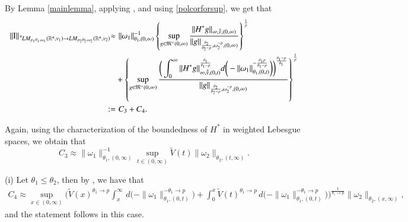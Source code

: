 \documentclass[11pt]{amsart}
\theoremstyle{plain}
\theoremstyle{definition}
\numberwithin{thm}{section}
\numberwithin{equation}{section}
\begin{document}
By  Lemma \ref{mainlemma}, applying \cite[Theorem~4.2, (d)]{mu_emb}, and using \eqref{polcorforsup}, we get that
\begin{align*}
\|{\operatorname{I}}\|_{{\,^{^{\bf c}}\!} LM_{p_1{\theta}_1,{\omega}_1}({{\mathbb R}^n},v_1){\rightarrow} LM_{p_2{\theta}_2,{\omega}_2}({{\mathbb R}^n},v_2)} {\approx} & \,\, \|{\omega}_1\|_{{\theta}_1,(0,\infty)}^{-1} \left\{\sup_{g\in {\mathfrak M}^+(0,\infty)} {\frac{\displaystyle {\|H^*g\|_{\infty,\tilde{\tilde{v}},(0,\infty)}}}{\displaystyle {\|g\|_{\frac{{\theta}_2}{{\theta}_2-p},{\omega}_2^{-p},(0,\infty)}}}} \right\}^{\frac{1}{p}}\\
&  + \left\{\sup_{g\in {\mathfrak M}^+(0,\infty)} {\frac{\displaystyle {\bigg(\int_0^{\infty} \|H^*g\|_{\infty,\tilde{\tilde {v}}, (0,t)} ^{\frac{{\theta}_1}{{\theta}_1 - p}} d\bigg(-\|{\omega}_1\|_{{\theta}_1,(0,t)}^{-\frac{{\theta}_1 p}{{\theta}_1 - p}}\bigg)\bigg)^{\frac{{\theta}_1 - p}{{\theta}_1}}}}{\displaystyle {\|g\|_{\frac{{\theta}_2}{{\theta}_2 - p},{\omega}_2^{-p},(0,\infty)}}}}\right\}^{\frac{1}{p}}\\
:= & \,\, C_3 + C_4.
\end{align*}

Again, using the characterization of the boundedness of $H^*$ in weighted Lebesgue spaces, we obtain that
\begin{equation*}
C_3{\approx} \|{\omega}_1\|_{{\theta}_1,(0,\infty)}^{-1} \sup_{t\in (0,{\infty})} \widetilde V(t) \|{\omega}_2\|_{{\theta}_2,(t,\infty)}.
\end{equation*}

{\rm (i)} Let  ${\theta}_1 \le {\theta}_2$, then by \cite[Theorem 4.1]{gop}, we have that
\begin{align*}
C_4  {\approx} \sup_{x\in (0,\infty)} \bigg( \widetilde{V}(x)^{{\theta}_1{\rightarrow} p} \int_x^{\infty} \, d \bigg(-\|{\omega}_1\|_{{\theta}_1,(0,t)}^{-{\theta}_1{\rightarrow} p}\bigg) + \int_0^x  \widetilde{V}(t)^{{\theta}_1{\rightarrow} p} \, d\bigg(-\|{\omega}_1\|_{{\theta}_1,(0,t)}^{- {\theta}_1{\rightarrow} p}\bigg) \bigg)^{{\frac{1}{{\theta}_1{\rightarrow} p}}} \|{\omega}_2\|_{{\theta}_2,(x,\infty)},
\end{align*}
and the statement follows in this case.
\end{document}
